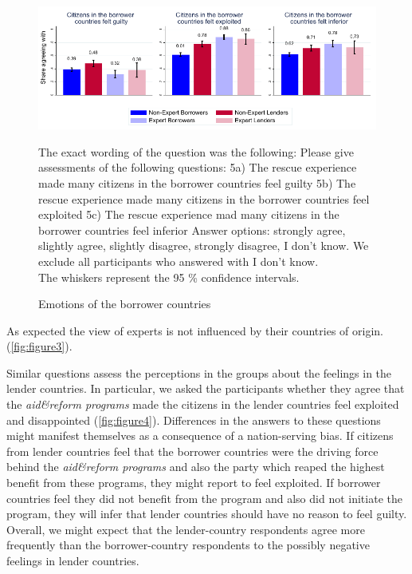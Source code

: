 \begin{figure}
\begin{center}
    \caption{Emotions of the borrower countries}
    \includegraphics[scale=1.2]{graph5_1.pdf}
    \label{fig:figure3}
    \end{center}
    \tiny 
      \begin{tablenotes} 
      {The exact wording of the question was the following: Please give assessments of the following questions: 5a) The rescue experience made many citizens in the borrower countries feel guilty 
      5b) The rescue experience made many citizens in the borrower countries feel exploited 5c) The rescue experience mad many citizens in the borrower countries feel inferior
      Answer options: strongly agree, slightly agree, slightly disagree, strongly disagree, I don't know. We exclude all participants who answered with I don't know. \\
      The whiskers represent the 95 \% confidence intervals.}
      \end{tablenotes}
\end{figure}

As expected the view of experts is not influenced by their countries of origin.  (\autoref{fig:figure3}).


Similar questions assess the perceptions in the groups about the
feelings in the lender countries. In particular, we asked the participants whether they
agree that the \textit{aid\&reform programs} made the citizens in the
lender countries feel exploited and disappointed (\autoref{fig:figure4}). Differences in the answers to these questions might manifest themselves as a consequence of  a nation-serving bias. If citizens from lender countries feel that the borrower countries were the driving force behind the \textit{aid\&reform programs} and also the party which reaped the highest benefit from these programs, they might report to feel exploited. If borrower countries feel they did not benefit from the program and also did not initiate the program, they will infer that lender countries should have no reason to feel guilty. Overall, we might expect that the lender-country respondents agree more
frequently than the borrower-country respondents to the possibly negative
feelings in lender countries.

